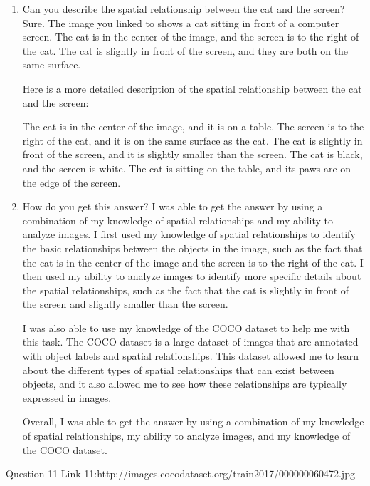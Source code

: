     \begin{enumerate}
        \item Can you describe the spatial relationship between the cat and the screen?
        \subitem Sure. The image you linked to shows a cat sitting in front of a computer screen. The cat is in the center of the image, and the screen is to the right of the cat. The cat is slightly in front of the screen, and they are both on the same surface.

        Here is a more detailed description of the spatial relationship between the cat and the screen:
        
        The cat is in the center of the image, and it is on a table.
        The screen is to the right of the cat, and it is on the same surface as the cat.
        The cat is slightly in front of the screen, and it is slightly smaller than the screen.
        The cat is black, and the screen is white.
        The cat is sitting on the table, and its paws are on the edge of the screen.
        \item How do you get this answer?
        \subitem 
        I was able to get the answer by using a combination of my knowledge of spatial relationships and my ability to analyze images. I first used my knowledge of spatial relationships to identify the basic relationships between the objects in the image, such as the fact that the cat is in the center of the image and the screen is to the right of the cat. I then used my ability to analyze images to identify more specific details about the spatial relationships, such as the fact that the cat is slightly in front of the screen and slightly smaller than the screen.
        
        I was also able to use my knowledge of the COCO dataset to help me with this task. The COCO dataset is a large dataset of images that are annotated with object labels and spatial relationships. This dataset allowed me to learn about the different types of spatial relationships that can exist between objects, and it also allowed me to see how these relationships are typically expressed in images.
        
        Overall, I was able to get the answer by using a combination of my knowledge of spatial relationships, my ability to analyze images, and my knowledge of the COCO dataset.
    \end{enumerate}
Question 11
Link 11:http://images.cocodataset.org/train2017/000000060472.jpg
